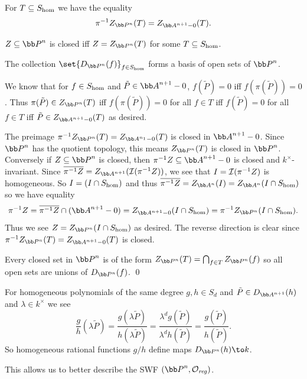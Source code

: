 \eproof

\bprop

    \benum
        \item For $T\subseteq S_{\rm hom}$ we have the equality
        $$ \pi^{-1}Z_{\bP^n}(T) = Z_{\bA^{n+1}-0}(T) . $$
        \item $Z\subseteq\bP^n$ is closed iff $Z=Z_{\bP^n}(T)$ for some $T\subseteq S_{\rm hom}$.
        \item The collection $\set{D_{\bP^n}(f)}_{f\in S_\homo}$ forms a basis of open sets of $\bP^n$.
    \eenum

\eprop

\bproof

    We know that for $f\in S_{\rm hom}$ and $\tilde P\in\bA^{n+1}-0$, $f(\tilde P)=0$ iff $f(\pi(\tilde P))=0$.
    Thus $\pi(\tilde P)\in Z_{\bP^n}(T)$ iff $f(\pi(\tilde P))=0$ for all $f\in T$ iff $f(\tilde P)=0$ for all $f\in T$ iff $\tilde P\in Z_{\bA^{n+1}-0}(T)$ as desired.

    The preimage $\pi^{-1}Z_{\bP^n}(T)=Z_{\bA^{n_1}-0}(T)$ is closed in $\bA^{n+1}-0$.
    Since $\bP^n$ has the quotient topology, this means $Z_{\bP^n}(T)$ is closed in $\bP^n$.
    Conversely if $Z\subseteq\bP^n$ is closed, then $\pi^{-1}Z\subseteq\bA^{n+1}-0$ is closed and $k^\times$-invariant.
    Since $\cl{\pi^{-1}Z}=Z_{\bA^{n+1}}(\I(\pi^{-1}Z))$, we see that $I={{\cal I}}(\pi^{-1}Z)$ is homogeneous.
    So $I=(I\cap S_{\rm hom})$ and thus $\cl{\pi^{-1}Z}=Z_{\bA^n}(I)=Z_{\bA^n}(I\cap S_\homo)$ so we have equality
    $$ \pi^{-1}Z = \cl{\pi^{-1}Z}\cap(\bA^{n+1}-0) = Z_{\bA^{n+1}-0}(I\cap S_\homo) = \pi^{-1}Z_{\bP^n}(I\cap S_\homo) . $$
    Thus we see $Z=Z_{\bP^n}(I\cap S_\homo)$ as desired.
    The reverse direction is clear since $\pi^{-1}Z_{\bP^n}(T)=Z_{\bA^{n+1}-0}(T)$ is closed.

    Every closed set in $\bP^n$ is of the form $Z_{\bP^n}(T)=\bigcap_{f\in T}Z_{\bP^n}(f)$ so all open sets are unions of $D_{\bP^n}(f)$.
    \qed

\eproof

For homogeneous polynomials of the same degree $g,h\in S_d$ and $\tilde P\in D_{\bA^{n+1}}(h)$ and $\lambda\in k^\times$ we see
$$ \frac gh(\lambda\tilde P) = \frac{g(\lambda\tilde P)}{h(\lambda\tilde P)} = \frac{\lambda^dg(\tilde P)}{\lambda^dh(\tilde P)} = \frac{g(\tilde P)}{h(\tilde P)} . $$
So homogeneous rational functions $g/h$ define maps $D_{\bP^n}(h)\to k$.

This allows us to better describe the SWF $(\bP^n,\O_\reg)$.

\blemm

